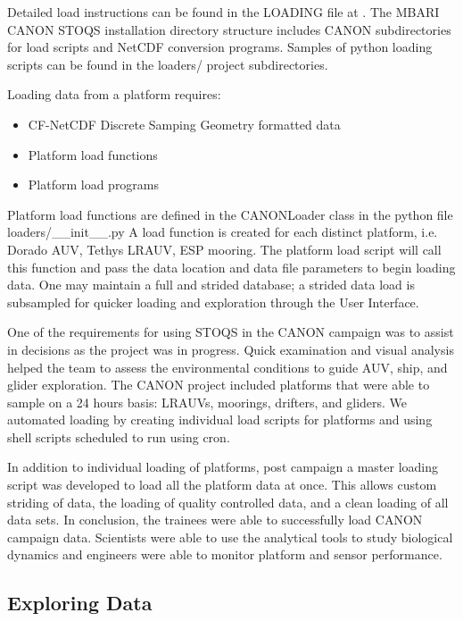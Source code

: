 \documentclass[conference]{IEEEtran}
\begin{document}
Detailed load instructions can be found in the LOADING file at \cite{STOQS}. The MBARI CANON STOQS installation directory structure includes CANON subdirectories for load scripts and NetCDF conversion programs. Samples of python loading scripts can be found in the loaders/ project subdirectories. 

Loading data from a platform requires:

\begin{itemize}
\item CF-NetCDF Discrete Samping Geometry formatted data
\item Platform load functions
\item Platform load programs
\end{itemize}

Platform load functions are defined in the CANONLoader class in the python file loaders/\_\_init\_\_.py   A load function is created for each distinct platform, i.e. Dorado AUV, Tethys LRAUV, ESP mooring. The platform load script will call this function and pass the data location and data file parameters to begin loading data.  One may maintain a full and strided database; a strided data load is subsampled for quicker loading and exploration through the User Interface.

One of the requirements for using STOQS in the CANON campaign was to assist in decisions as the project was in progress. Quick examination and visual analysis helped the team to assess the environmental conditions to guide AUV, ship, and glider exploration.  The CANON project included platforms that were able to sample on a 24 hours basis: LRAUVs, moorings, drifters, and gliders. We automated loading by creating individual load scripts for platforms and using shell scripts scheduled to run using cron. 

In addition to individual loading of platforms, post campaign a master loading script was developed to load all the platform data at once.  This allows custom striding of data, the loading of quality controlled data, and a clean loading of all data sets.  In conclusion, the trainees were able to successfully load CANON campaign data.  Scientists were able to use the analytical tools to study biological dynamics and engineers were able to monitor platform and sensor performance.  



\subsection{Exploring Data}
\end{document}
